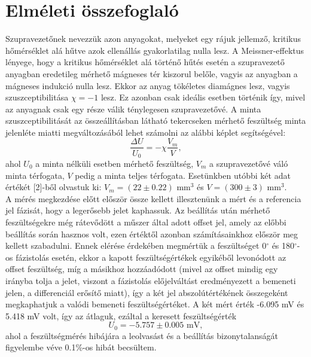 \documentclass[12pt,a4paper]{article}
\begin{document}
\section{Elméleti összefoglaló}
\hspace*{10pt} Szupravezetőnek nevezzük azon anyagokat, melyeket egy rájuk jellemző, kritikus hőmérséklet alá hűtve azok ellenállás gyakorlatilag nulla lesz. A Meissner-effektus lényege, hogy a kritikus hőmérséklet alá történő hűtés esetén a szupravezető anyagban eredetileg mérhető mágneses tér kiszorul belőle, vagyis az anyagban a mágneses indukció nulla lesz. Ekkor az anyag tökéletes diamágnes lesz, vagyis szuszceptibilitása $\chi=-1$ lesz. Ez azonban csak ideális esetben történik így, mivel az anyagnak csak egy része válik ténylegesen szupravezetővé. A minta szuszceptibilitását az összeállításban látható tekercseken mérhető feszültség minta jelenléte miatti megváltozásából lehet számolni az alábbi képlet segítségével:
$$\frac{\Delta U}{U_0}=-\chi \frac{V_m}{V},$$
ahol $U_0$ a minta nélküli esetben mérhető feszültség, $V_m$ a szupravezetővé váló minta térfogata, $V$ pedig a minta teljes térfogata. Esetünkben utóbbi két adat értékét [2]-ből olvastuk ki: $V_m=(22 \pm 0.22)$ mm$^{3}$ és $V=(300 \pm 3)$ mm$^3$.\\
\hspace*{10pt} A mérés megkezdése előtt először össze kellett illesztenünk a mért és a referencia jel fázisát, hogy a legerősebb jelet kaphassuk. Az beállítás után mérhető feszültségekre még rátevődött a műszer által adott offset jel, amely az előbbi beállítás során hasznos volt, ezen értéktől azonban számításainkhoz először meg kellett szabadulni. Ennek elérése érdekében megmértük a feszültséget 0$^{\circ}$ és 180$^{\circ}$-os fázistolás esetén, ekkor a kapott feszültségértékek egyikéből levonódott az offset feszültség, míg a másikhoz hozzáadódott (mivel az offset mindig egy irányba tolja a jelet, viszont a fázistolás előjelváltást eredményezett a bemeneti jelen, a differenciál erősítő miatt), így a két jel abszolútértékének  összegeként megkaphatjuk a valódi bemeneti feszültségértéket. A két mért érték -6.095 mV és 5.418 mV volt, így az átlaguk, ezáltal a keresett feszültségérték
$$U_0=-5.757 \pm 0.005 \textrm{ mV},$$
ahol a feszültségmérés hibájára a leolvasást és a beállítás bizonytalanságát figyelembe véve 0.1$\%$-os hibát becsültem.
\end{document}
